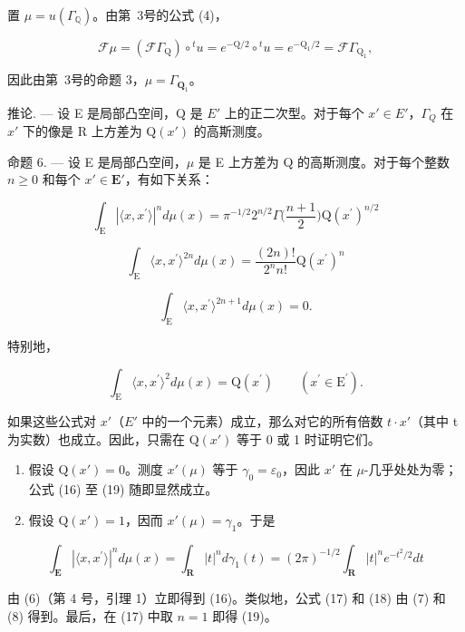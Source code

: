 置 \(\mu = u(\Gamma_{\mathbb{Q}})\)。由第~3号的公式 (4)，

\[
\mathcal {F} \mu = \left(\mathcal {F} \Gamma_ {\mathrm{Q}}\right) \circ {} ^ {t} u = e ^ {- \mathrm{Q} / 2} \circ {} ^ {t} u = e ^ {- \mathrm{Q} _ {1} / 2} = \mathcal {F} \Gamma_ {\mathrm{Q} _ {1}},
\]

因此由第~3号的命题 3，\(\mu = \Gamma_{\mathbf{Q}_1}\)。

推论. --- 设 E 是局部凸空间，Q 是 \(E'\) 上的正二次型。对于每个 \(x' \in E'\)，\(\Gamma_{Q}\) 在 \(x'\) 下的像是 R 上方差为 \(\mathrm{Q}(x')\) 的高斯测度。

命题 6. --- 设 E 是局部凸空间，\(\mu\) 是 E 上方差为 Q 的高斯测度。对于每个整数 \(n \geqslant 0\) 和每个 \(x' \in \mathbf{E}'\)，有如下关系：

\[
\int_ {\mathrm{E}} | \langle x, x ^ {\prime} \rangle | ^ {n} d \mu (x) = \pi^ {- 1 / 2} 2 ^ {n / 2} \Gamma \Big (\frac {n + 1}{2} \Big) \mathrm{Q} (x ^ {\prime}) ^ {n / 2}\tag{16}
\]

\[
\int_ {\mathrm{E}} \langle x, x ^ {\prime} \rangle^ {2 n} d \mu (x) = \frac {(2 n) !}{2 ^ {n} n !} \mathrm{Q} (x ^ {\prime}) ^ {n}\tag{17}
\]

\[
\int_ {\mathrm{E}} \langle x, x ^ {\prime} \rangle^ {2 n + 1} d \mu (x) = 0.\tag{18}
\]

特别地，

\[
\int_ {\mathrm{E}} \langle x, x ^ {\prime} \rangle^ {2} d \mu (x) = \mathrm{Q} (x ^ {\prime}) \qquad (x ^ {\prime} \in \mathrm{E} ^ {\prime}).\tag{19}
\]

如果这些公式对 \(x'\)（\(E'\) 中的一个元素）成立，那么对它的所有倍数 \(t \cdot x'\)（其中 t 为实数）也成立。因此，只需在 \(\mathrm{Q}(x')\) 等于 0 或 1 时证明它们。

\begin{enumerate}
\def\labelenumi{\alph{enumi})}
\item
  假设 \(\mathrm{Q}(x') = 0\)。测度 \(x'(\mu)\) 等于 \(\gamma_{0} = \varepsilon_{0}\)，因此 \(x'\) 在 \(\mu\)-几乎处处为零；公式 (16) 至 (19) 随即显然成立。
\item
  假设 \(\mathrm{Q}(x') = 1\)，因而 \(x'(\mu) = \gamma_{1}\)。于是
\end{enumerate}

\[
\int_ {\mathbf {E}} | \langle x, x ^ {\prime} \rangle | ^ {n} d \mu (x) = \int_ {\mathbf {R}} | t | ^ {n} d \gamma_ {1} (t) = (2 \pi) ^ {- 1 / 2} \int_ {\mathbf {R}} | t | ^ {n} e ^ {- t ^ {2} / 2} d t
\]

由 (6)（第 4 号，引理 1）立即得到 (16)。类似地，公式 (17) 和 (18) 由 (7) 和 (8) 得到。最后，在 (17) 中取 \(n = 1\) 即得 (19)。

